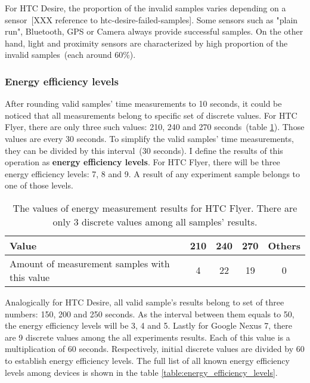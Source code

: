 
For HTC Desire, the proportion of the invalid samples varies depending on a sensor\ [XXX reference to htc-desire-failed-samples]. Some sensors such as "plain run", Bluetooth, GPS or Camera always provide successful samples. On the other hand, light and proximity sensors are characterized by high proportion of the invalid samples\ (each around 60\%). 



\subsubsection{Energy efficiency levels}
After rounding valid samples' time measurements to 10 seconds, it could be noticed that all measurements belong to specific set of discrete values. For HTC Flyer, there are only three such values: 210, 240 and 270 seconds\ (table \ref{table:discrete_values}). Those values are every 30 seconds. To simplify the valid samples' time measurements, they can be divided by this interval\ (30 seconds). I define the results of this operation as \textbf{energy efficiency levels}. For HTC Flyer, there will be three energy efficiency levels: 7, 8 and 9. A result of any experiment sample belongs to one of those levels. 
			
\begin{center}
	\begin{table}
    \begin{tabular}{| l | c | c | c | c |}
    \hline
      Value & 210 & 240 & 270 & Others\\ \hline
    Amount of measurement samples with this value & 4 & 22 &  19 & 0\\ \hline
    \end{tabular}
    \caption{The values of energy measurement results for HTC Flyer. There are only 3 discrete values among all samples' results.}
	\label{table:discrete_values}
	\end{table}
\end{center}		
			
Analogically for HTC Desire, all valid sample's results belong to set of three numbers: 150, 200 and 250 seconds. As the interval between them equals to 50, the energy efficiency levels will be 3, 4 and 5. Lastly for Google Nexus 7, there are 9 discrete values among the all experiments results. Each of this value is a multiplication of 60 seconds. Respectively, initial discrete values are divided by 60 to establish energy efficiency levels. The full list of all known energy efficiency levels among devices is shown in the table \ref{table:energy_efficiency_levels}.
			

